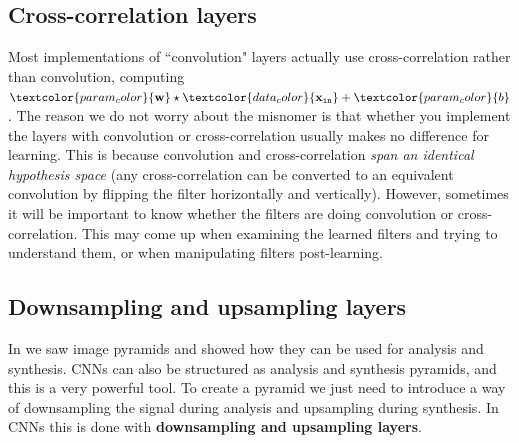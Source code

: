 \subsection{Cross-correlation layers}
Most implementations of ``convolution" layers actually use cross-correlation rather than convolution, computing $\textcolor{param_color}{\mathbf{w}} \star \textcolor{data_color}{\xin} + \textcolor{param_color}{b}$. The reason we do not worry about the misnomer is that whether you implement the layers with convolution or cross-correlation usually makes no difference for learning. This is because convolution and cross-correlation \textit{span an identical hypothesis space} (any cross-correlation can be converted to an equivalent convolution by flipping the filter horizontally and vertically). However, sometimes it will be important to know whether the filters are doing convolution or cross-correlation. This may come up when examining the learned filters and trying to understand them, or when manipulating filters post-learning.%


\subsection{Downsampling and upsampling layers}


In \chap{\ref{chapter:image_pyramids}} we saw image pyramids and showed how they can be used for analysis and synthesis. CNNs can also be structured as analysis and synthesis pyramids, and this is a very powerful tool. To create a pyramid we just need to introduce a way of downsampling the signal during analysis and upsampling during synthesis. In CNNs this is done with {\bf downsampling and upsampling layers}.


